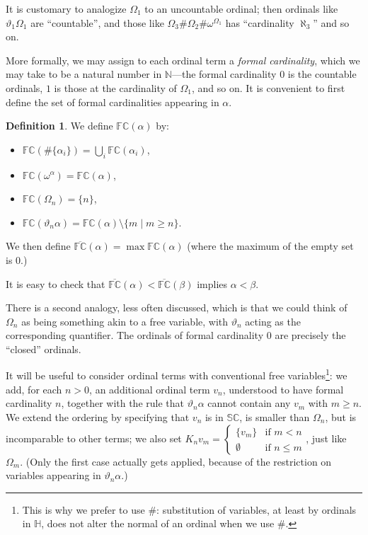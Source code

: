 \documentclass[11pt]{amsart}
\theoremstyle{definition}
\newtheorem{definition}[theorem]{Definition}
\begin{document}
It is customary to analogize $\Omega_1$ to an uncountable ordinal; then ordinals like $\vartheta_1\Omega_1$ are ``countable'', and those like $\Omega_3\#\Omega_2\#\omega^{\Omega_1}$ has ``cardinality $\aleph_3$'' and so on.

More formally, we may assign to each ordinal term a \emph{formal cardinality}, which we may take to be a natural number in $\mathbb{N}$---the formal cardinality $0$ is the countable ordinals, $1$ is those at the cardinality of $\Omega_1$, and so on. It is convenient to first define the set of formal cardinalities appearing in $\alpha$.

\begin{definition}
  We define $\mathbb{FC}(\alpha)$ by:
  \begin{itemize}
  \item $\mathbb{FC}(\#\{\alpha_i\})=\bigcup_i\mathbb{FC}(\alpha_i)$,
  \item $\mathbb{FC}(\omega^\alpha)=\mathbb{FC}(\alpha)$,
  \item $\mathbb{FC}(\Omega_n)=\{n\}$,
  \item $\mathbb{FC}(\vartheta_n\alpha)=\mathbb{FC}(\alpha)\setminus\{m\mid m\geq n\}$.
  \end{itemize}
  
  We then define $\overline{\mathbb{FC}}(\alpha)=\max\mathbb{FC}(\alpha)$ (where the maximum of the empty set is $0$.)
\end{definition}

It is easy to check that $\overline{\mathbb{FC}}(\alpha)<\overline{\mathbb{FC}}(\beta)$ implies $\alpha<\beta$.

There is a second analogy, less often discussed, which is that we could think of $\Omega_n$ as being something akin to a free variable, with $\vartheta_n$ acting as the corresponding quantifier. The ordinals of formal cardinality $0$ are precisely the ``closed'' ordinals. %

It will be useful to consider ordinal terms with conventional free variables\footnote{This is why we prefer to use $\#$: substitution of variables, at least by ordinals in $\mathbb{H}$, does not alter the normal of an ordinal when we use $\#$.}: we add, for each $n>0$, an additional ordinal term $v_n$, understood to have formal cardinality $n$, together with the rule that $\vartheta_n\alpha$ cannot contain any $v_m$ with $m\geq n$. We extend the ordering by specifying that $v_n$ is in $\mathbb{SC}$, is smaller than $\Omega_n$, but is incomparable to other terms; we also set $K_nv_m=\left\{\begin{array}{ll}
                              \{v_m\}&\text{if }m<n\\
                              \emptyset&\text{if }n\leq m
                                         \end{array}\right.$, just like $\Omega_m$. (Only the first case actually gets applied, because of the restriction on variables appearing in $\vartheta_n\alpha$.)
\end{document}
